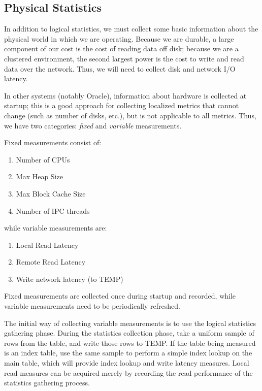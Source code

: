 \subsection{Physical Statistics}
In addition to logical statistics, we must collect some basic information about the physical world in which we are operating. Because we are durable, a large component of our cost is the cost of reading data off disk; because we are a clustered environment, the second largest power is the cost to write and read data over the network. Thus, we will need to collect disk and network I/O latency. 

In other systems (notably Oracle\cite{Oracle}), information about hardware is collected at startup; this is a good approach for collecting localized metrics that cannot change (such as number of disks, etc.), but is not applicable to all metrics. Thus, we have two categories: \emph{fixed} and \emph{variable} measurements.

Fixed measurements consist of:

\begin{enumerate}
				\item Number of CPUs
				\item Max Heap Size
				\item Max Block Cache Size
				\item Number of IPC threads
\end{enumerate}

while variable measurements are:
\begin{enumerate}
				\item Local Read Latency
				\item Remote Read Latency
				\item Write network latency (to TEMP)
\end{enumerate}

Fixed measurements are collected once during startup and recorded, while variable measurements need to be periodically refreshed. 

The initial way of collecting variable measurements is to use the logical statistics gathering phase. During the statistics collection phase, take a uniform sample of rows from the table, and write those rows to TEMP. If the table being measured is an index table, use the same sample to perform a simple index lookup on the main table, which will provide index lookup and write latency measures. Local read measures can be acquired merely by recording the read performance of the statistics gathering process.


